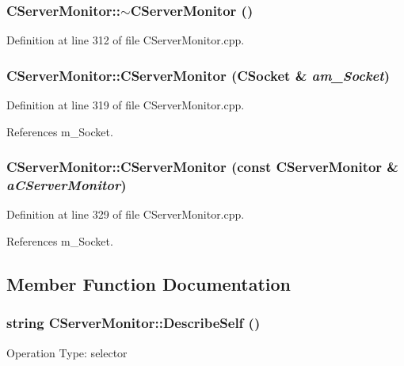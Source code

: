 \subsubsection{\setlength{\rightskip}{0pt plus 5cm}CServer\-Monitor::$\sim$CServer\-Monitor ()}\label{classCServerMonitor_a1}




Definition at line 312 of file CServer\-Monitor.cpp.
\subsubsection{\setlength{\rightskip}{0pt plus 5cm}CServer\-Monitor::CServer\-Monitor ({\bf CSocket} \& {\em am\_\-Socket})}\label{classCServerMonitor_a2}




Definition at line 319 of file CServer\-Monitor.cpp.

References m\_\-Socket.
\subsubsection{\setlength{\rightskip}{0pt plus 5cm}CServer\-Monitor::CServer\-Monitor (const CServer\-Monitor \& {\em a\-CServer\-Monitor})}\label{classCServerMonitor_a3}




Definition at line 329 of file CServer\-Monitor.cpp.

References m\_\-Socket.

\subsection{Member Function Documentation}
\subsubsection{\setlength{\rightskip}{0pt plus 5cm}string CServer\-Monitor::Describe\-Self ()\hspace{0.3cm}{\tt  [virtual]}}\label{classCServerMonitor_a8}


Operation Type: selector

